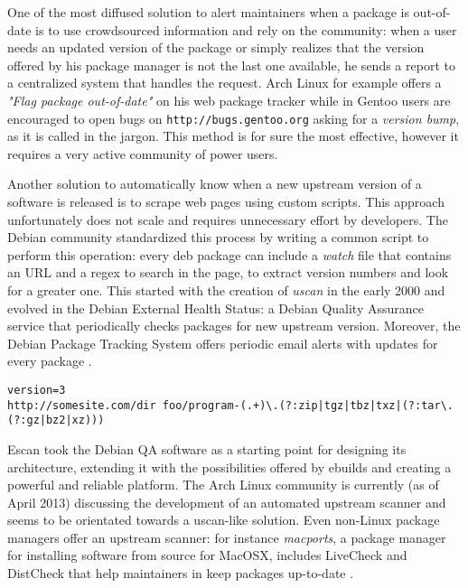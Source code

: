 One of the most diffused solution to alert maintainers when a package is out-of-date is to use crowdsourced information and rely on the community: when a user needs an updated version of the package or simply realizes that the version offered by his package manager is not the last one available, he sends a report to a centralized system that handles the request. Arch Linux for example offers a \emph{"Flag package out-of-date"} on his web package tracker \cite{arch_flaghelp} while in Gentoo users are encouraged to open bugs on \texttt{http://bugs.gentoo.org} asking for a \emph{version bump}, as it is called in the jargon. This method is for sure the most effective, however it requires a very active community of power users.

Another solution to automatically know when a new upstream version of a software is released is to scrape web pages using custom scripts. This approach unfortunately does not scale and requires unnecessary effort by developers.
The Debian community standardized this process by writing a common script to perform this operation: every deb package can include a \emph{watch} file that contains an URL and a regex to search in the page, to extract version numbers and look for a greater one.
This started with the creation of \emph{uscan} in the early 2000 and evolved in the Debian External Health Status: a Debian Quality Assurance service that periodically checks packages for new upstream version. Moreover, the Debian Package Tracking System offers periodic email alerts with updates for every package \cite{debian_qa}.

\vspace{0.5cm}
\lstset{caption=Example of a watch file, label=watch file, numbers=left, stepnumber=1, frame=single, breaklines=true}
\begin{lstlisting}
version=3
http://somesite.com/dir foo/program-(.+)\.(?:zip|tgz|tbz|txz|(?:tar\.(?:gz|bz2|xz)))
\end{lstlisting}
\vspace{0.5cm}

Escan took the Debian QA software as a starting point for designing its architecture, extending it with the possibilities offered by ebuilds and creating a powerful and reliable platform.
The Arch Linux community is currently (as of April 2013) discussing the development of an automated upstream scanner \cite{arch_scanner} and seems to be orientated towards a uscan-like solution.
Even non-Linux package managers offer an upstream scanner: for instance \emph{macports}, a package manager for installing software from source for MacOSX, includes LiveCheck and DistCheck that help maintainers in keep packages up-to-date \cite{macports_livecheck}.